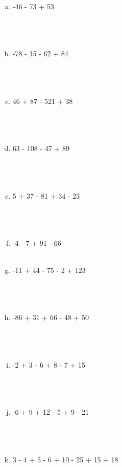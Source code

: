 \documentclass[a4paper,14pt]{article}
\begin{document}
\begin{multicols}{2}
\begin{enumerate}
    			\begin{enumerate}[a)]
    				\item -46 - 73 + 53 \\\\\\\\
    				\item -78 - 15 - 62 + 84 \\\\\\\\
    				\item 46 + 87 - 521 + 38 \\\\\\\\
    				\item 63 - 108 - 47 + 89 \\\\\\\\
    				\item 5 + 37 - 81 + 34 - 23 \\\\\\\\
    				\item -4 - 7 + 91 - 66 \\\\
    				\item -11 + 44 - 75 - 2 + 123 \\\\\\\\
    				\item -86 + 31 + 66 - 48 + 50 \\\\\\\\
    				\item -2 + 3 - 6 + 8 - 7 + 15 \\\\\\\\
    				\item -6 + 9 + 12 - 5 + 9 - 21 \\\\\\\\
    				\item 3 - 4 + 5 - 6 + 10 - 25 + 15 + 18 \\\\\\\\

\end{enumerate}
\end{enumerate}
\end{multicols}
\end{document}
